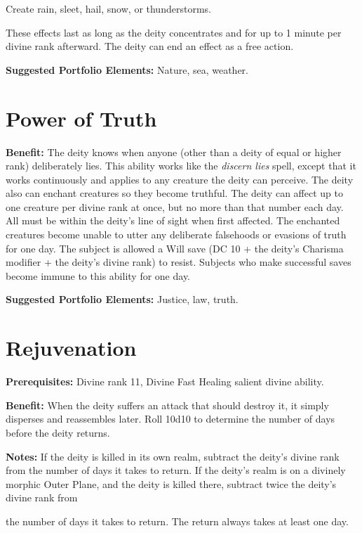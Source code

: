 \documentclass{article}
\begin{document}
\parindent=3pt
Create rain, sleet, hail, snow, or thunderstorms.

\parindent=0pt
These effects last as long as the deity concentrates and for up to 1 minute per 
divine rank afterward. The deity can end an effect as a free action. 

\textbf{Suggested Portfolio Elements:} Nature, sea, weather.

\vspace{12pt}
\section*{Power of Truth}

\textbf{Benefit:} The deity knows when anyone (other than a deity of equal or higher 
rank) deliberately lies. This ability works like the \textit{discern lies }spell, 
except that it works continuously and applies to any creature the deity can perceive. 
The deity also can enchant creatures so they become truthful. The deity can affect 
up to one creature per divine rank at once, but no more than that number each day. 
All must be within the deity's line of sight when first affected. The enchanted 
creatures become unable to utter any deliberate falsehoods or evasions of truth 
for one day. The subject is allowed a Will save (DC 10 + the deity's Charisma modifier 
+ the deity's divine rank) to resist. Subjects who make successful saves become 
immune to this ability for one day. 

\textbf{Suggested Portfolio Elements:} Justice, law, truth.

\vspace{12pt}
\section*{Rejuvenation}

\textbf{Prerequisites:} Divine rank 11, Divine Fast Healing salient divine ability.

\textbf{Benefit:} When the deity suffers an attack that should destroy it, it simply 
disperses and reassembles later. Roll 10d10 to determine the number of days before 
the deity returns.

\textbf{Notes:} If the deity is killed in its own realm, subtract the deity's divine 
rank from the number of days it takes to return. If the deity's realm is on a divinely 
morphic Outer Plane, and the deity is killed there, subtract twice the deity's 
divine rank from

the number of days it takes to return. The return always takes at least one day.
\end{document}
